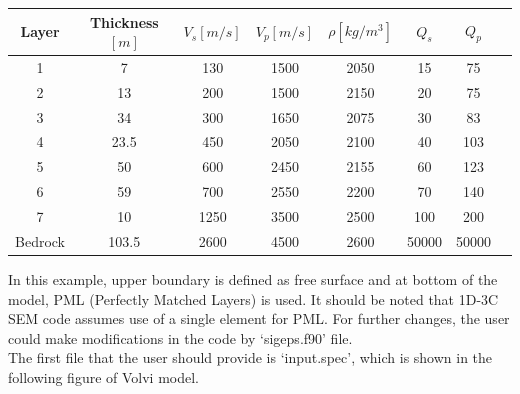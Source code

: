 \vspace{1cm}
\label{TABvolvi}
\begin{center}
\begin{tabular}{|c|c|c|c|c|c|c|c|} \hline                                
Layer  & Thickness $[m]$ & $V_{s} [m/s] $ &  $V_{p} [m/s] $   & $\rho [kg/m^{3}]$ & $Q_{s}$& $Q_{p}$  \\ \hline \hline 
1     & 7    	& 130 	& 1500  & 2050   &  15 	  & 75  \\ \hline    
2     & 13     	& 200   & 1500	& 2150   &  20    & 75  \\ \hline    
3     & 34    	& 300   & 1650	& 2075   &  30    & 83  \\ \hline    
4     & 23.5    & 450   & 2050	& 2100   &  40    & 103 \\ \hline    
5     & 50    	& 600   & 2450	& 2155   &  60    & 123	\\ \hline    
6     & 59    	& 700   & 2550	& 2200   &  70    & 140	 \\ \hline    
7     & 10    	& 1250  & 3500	& 2500   &  100   & 200  \\ \hline    
Bedrock& 103.5  & 2600  & 4500	& 2600   &  50000 & 50000 \\ \hline    
\end{tabular}
\end{center}

In this example, upper boundary is defined as free surface and at bottom of the model, PML (Perfectly Matched Layers) is used. It should be noted that 1D-3C SEM code assumes use of a single element for PML. For further changes, the user could make modifications  in the code by ‘sigeps.f90’ file. \\


The first file that the user should provide is ‘input.spec’, which is shown in the following figure of Volvi model. \\

